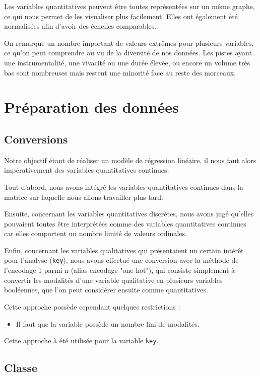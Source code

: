 \documentclass[a4paper, 12pt]{report}
\begin{document}
Les variables quantitatives peuvent être toutes représentées sur un même graphe, ce qui nous permet de les visualiser plus facilement. Elles ont également été normalisées afin d'avoir des échelles comparables.



On remarque un nombre important de valeurs extrêmes pour plusieurs variables, ce qu'on peut comprendre au vu de la diversité de nos données. Les pistes ayant une instrumentalité, une vivacité ou une durée élevée, ou encore un volume très bas sont nombreuses mais restent une minorité face au reste des morceaux.

\section{Préparation des données}

\subsection{Conversions}

Notre objectif étant de réaliser un modèle de régression linéaire, il nous faut alors impérativement des variables quantitatives continues.

Tout d'abord, nous avons intégré les variables quantitatives continues dans la matrice sur laquelle nous allons travailler plus tard.

Ensuite, concernant les variables quantitatives discrètes, nous avons jugé qu'elles pouvaient toutes être interprétées comme des variables quantitatives continues car elles comportent un nombre limité de valeurs ordinales.

Enfin, concernant les variables qualitatives qui présentaient un certain intérêt pour l'analyse (\verb|key|), nous avons effectué une conversion avec la méthode de l'encodage 1 parmi n (alias encodage "one-hot"), qui consiste simplement à convertir les modalités d'une variable qualitative en plusieurs variables booléennes, que l'on peut considérer ensuite comme quantitatives.\cite{Encodage_1_parmis_n}

Cette approche possède cependant quelques restrictions : 
\begin{itemize}
    \item Il faut que la variable possède un nombre fini de modalités.
\end{itemize}

Cette approche à été utilisée pour la variable \verb|key|.

\subsection{Classe}
\end{document}
